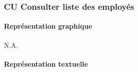\newpage

\subsubsection{CU Consulter liste des employés}

\paragraph{Représentation graphique}

N.A.

\paragraph{Représentation textuelle}
\hypertarget{CU_modifier}{}


